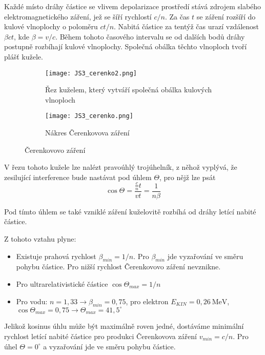 \documentclass[../../main.tex]{subfiles}
\begin{document}
Každé místo dráhy částice se vlivem depolarizace prostředí stává zdrojem slabého elektromagnetického záření, jež se šíří rychlostí $c/n$. Za čas $t$ se záření rozšíří do kulové vlnoplochy o poloměru $ct/n$. Nabitá částice za tentýž čas urazí vzdálenost $\beta ct$, kde $\beta = v/c$. Během tohoto časového intervalu se od dalších bodů dráhy postupně rozbíhají kulové vlnoplochy. Společná obálka těchto vlnoploch tvoří plášť kužele. 

\begin{figure}[h!]
	\begin{subfigure}[c]{0.5\linewidth}
		\texttt{[image: JS3\_cerenko2.png]}
		\caption{Řez kuželem, který vytváří společná obálka kulových vlnoploch}
	\end{subfigure}
	\begin{subfigure}[c]{0.5\linewidth}
		\texttt{[image: JS3\_cerenko.png]}
		\caption{Nákres Čerenkovova záření}
	\end{subfigure}
	\caption{Čerenkovovo záření}
\end{figure}

V řezu tohoto kužele lze nalézt pravoúhlý trojúhelník, z něhož vyplývá, že zesilující interference bude nastávat pod úhlem $\varTheta$, pro nějž lze psát
\begin{equation}
\cos \varTheta = \dfrac{\frac{c}{n} t }{v t} = \dfrac{1}{n \beta}
\end{equation}

Pod tímto úhlem se také vzniklé záření kuželovitě rozbíhá od dráhy letící nabité částice.

Z tohoto vztahu plyne:
\begin{itemize}
	\item Existuje prahová rychlost $\beta_{min} = 1/n$. Pro $\beta_{min}$ jde vyzařování ve směru pohybu částice. Pro nižší rychlost Čerenkovovo záření nevznikne.
	\item Pro ultrarelativistické částice $\cos \varTheta _{max} = 1/n$
	\item Pro vodu: $n = 1,33 \rightarrow \beta_{min} = 0,75$, pro elektron $E_{KIN} = 0,26 ~\mathrm{MeV}$, $\cos \varTheta _{max} = 0,75 \rightarrow \varTheta_{max} = 41,5 ^\circ$ 
\end{itemize}

Jelikož kosinus úhlu může být maximálně roven jedné, dostáváme minimální rychlost letící nabité částice pro produkci Čerenkovova záření $v_{min} = c/n$. Pro úhel $\varTheta = 0^{\circ}$ a vyzařování jde ve směru pohybu částice.
\end{document}
